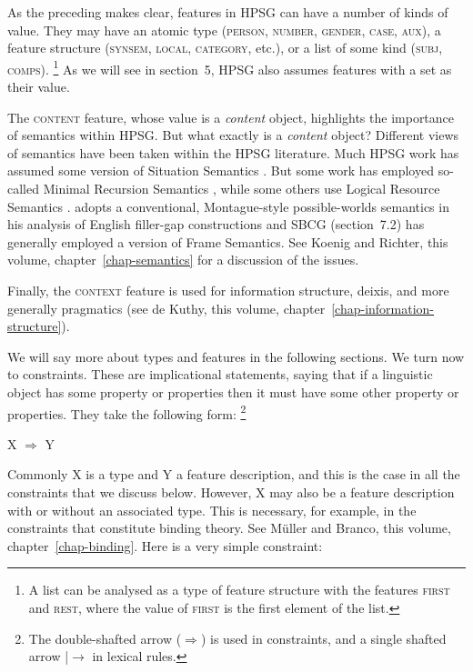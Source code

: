 \documentclass[output=paper
	        ,collection
	        ,collectionchapter
 	        ,biblatex
                ,babelshorthands
                ,newtxmath
                ,draftmode
                ,colorlinks, citecolor=brown
]{langscibook}
\begin{document}
As the preceding makes clear, features in HPSG can have a number of kinds of value. They may have an atomic type (\textsc{person, number, gender, case, aux}), a feature structure (\textsc{synsem, local, category}, etc.), or a list of some kind (\textsc{subj, comps}).%
%
\footnote{A list can be analysed as a type of feature structure with the features \textsc{first} and \textsc{rest}, where the value of \textsc{first} is the first element of the list.}
%
As we will see in section~5, HPSG also assumes features with a set as their value.

The \textsc{content} feature, whose value is a \emph{content} object, highlights the importance of semantics within HPSG. But what exactly is a \emph{content} object? Different views of semantics have been taken within the HPSG literature. Much HPSG work has assumed some version of Situation Semantics \citep{BP83a}. But some work has employed so-called Minimal Recursion Semantics \citep{CFPS2005a}, while some others use Logical Resource Semantics \citep{RichterandSailer2001}. \citet[501]{Sag2010b} adopts a conventional, Montague-style possible-worlds semantics in his analysis of English filler-gap constructions and SBCG (section~7.2) has generally employed a version of Frame Semantics. See Koenig and Richter, this volume, chapter~\ref{chap-semantics} for a discussion of the issues.

Finally, the \textsc{context} feature is used for information structure, deixis, and more generally pragmatics (see de Kuthy, this volume, chapter~\ref{chap-information-structure}).

We will say more about types and features in the following sections. We turn now to constraints. These are implicational statements, saying that if a linguistic object has some property or properties then it must have some other property or properties. They take the following form:%
%
\footnote{The double-shafted arrow ($\Rightarrow$) is used in constraints, and a single shafted arrow |$\rightarrow$ in lexical rules.}
%

\ea\label{ex:prop10}
X $\Rightarrow$ Y
\z

Commonly X is a type and Y a feature description, and this is the case in all the constraints that we discuss below. However, X may also be a feature description with or without an associated type. This is necessary, for example, in the constraints that constitute binding theory. See Müller and Branco, this volume, chapter~\ref{chap-binding}. Here is a very simple constraint:
\end{document}

